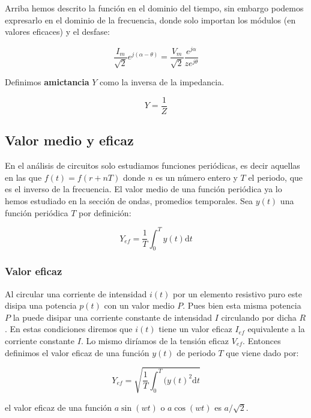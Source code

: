 \documentclass[12pt,a4paper]{article}
\newcommand{\D}{\mathrm{d}}
\begin{document}
Arriba hemos descrito la función en el dominio del tiempo, sin embargo podemos expresarlo en el dominio de la frecuencia, donde solo importan los módulos (en valores eficaces) y el desfase:

\begin{equation}
\dfrac{I_m}{\sqrt{2}} e^{j(\alpha - \theta)} = \dfrac{V_m}{\sqrt{2}} \dfrac{e^{j\alpha}}{z e^{j \theta}}
\end{equation}

Definimos \textbf{amictancia} $Y$ como la inversa de la impedancia.

\begin{equation}
Y = \dfrac{1}{Z}
\end{equation}

\subsection{Valor medio y eficaz}

En el análisis de circuitos solo estudiamos funciones periódicas, es decir aquellas en las que $f(t) = f(r+nT)$ donde $n$ es un número entero y $T$ el periodo, que es el inverso de la frecuencia. El valor medio de una función periódica ya lo hemos estudiado en la sección de ondas, promedios temporales. Sea $y(t)$ una función periódica $T$ por definición:

\begin{equation}
Y_{ef} = \dfrac{1}{T} \int_0^T y(t) \D t
\end{equation}

\subsubsection{Valor eficaz}

Al circular una corriente de intensidad $i(t)$ por un elemento resistivo puro este disipa una potencia $p(t)$ con un valor medio $P$. Pues bien esta misma potencia $P$ la puede disipar una corriente constante de intensidad $I$ circulando por dicha $R$. En estas condiciones diremos que $i(t)$ tiene un valor eficaz $I_{ef}$ equivalente a la corriente constante $I$. Lo mismo diríamos de la tensión eficaz $V_{ef}$. Entonces definimos el valor eficaz de una función $y(t)$ de periodo $T$ que viene dado por:

\begin{equation}
Y_{ef} = \sqrt{\dfrac{1}{T} \int_0^T (y(t)^2 \D t}
\end{equation}

el valor eficaz de una función $a \sin (wt)$ o $a \cos (wt)$ es $a/\sqrt{2}$.
\end{document}
